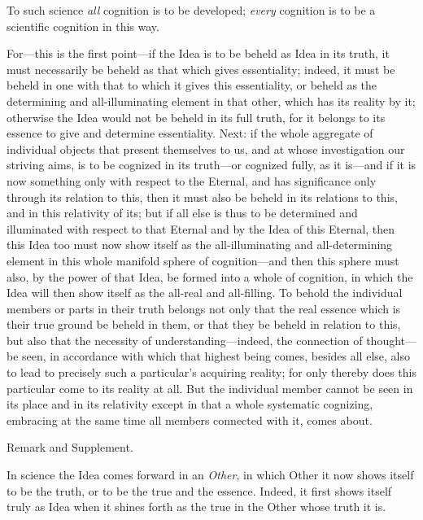 \documentclass[12pt,a4paper]{book}
\begin{document}
To such science \emph{all} cognition is to be developed; \emph{every} cognition is to
be a scientific cognition in this way.

For---this is the first point---if the Idea is to be beheld as Idea in its truth, it
must necessarily be beheld as that which gives essentiality; indeed, it must be beheld
in one with that to which it gives this essentiality, or beheld as the determining and
all-illuminating element in that other, which has its reality by it; otherwise the
Idea would not be beheld in its full truth, for it belongs to its essence to give and
determine essentiality. Next: if the whole aggregate of individual objects that
present themselves to us, and at whose investigation our striving aims, is to be
cognized in its truth---or cognized fully, as it is---and if it is now something only
with respect to the Eternal, and has significance only through its relation to this,
then it must also be beheld in its relations to this, and in this relativity of its;
but if all else is thus to be determined and illuminated with respect to that Eternal
and by the Idea of this Eternal, then this Idea too must now show itself as the
all-illuminating and all-determining element in this whole manifold sphere of
cognition---and then this sphere must also, by the power of that Idea, be formed into a
whole of cognition, in which the Idea will then show itself as the all-real and
all-filling. To behold the individual members or parts in their truth belongs not only
that the real essence which is their true ground be beheld in them, or that they be
beheld in relation to this, but also that the necessity of understanding---indeed, the
connection of thought---be seen, in accordance with which that highest being comes,
besides all else, also to lead to precisely such a particular's acquiring reality; for
only thereby does this particular come to its reality at all. But the individual member
cannot be seen in its place and in its relativity except in that a whole systematic
cognizing, embracing at the same time all members connected with it, comes about.

\begin{center}Remark and Supplement.\end{center}
In science the Idea comes forward in an \emph{Other}, in which Other it now shows
itself to be the truth, or to be the true and the essence. Indeed, it first shows
itself truly as Idea when it shines forth as the true in the Other whose truth it is.
\end{document}
